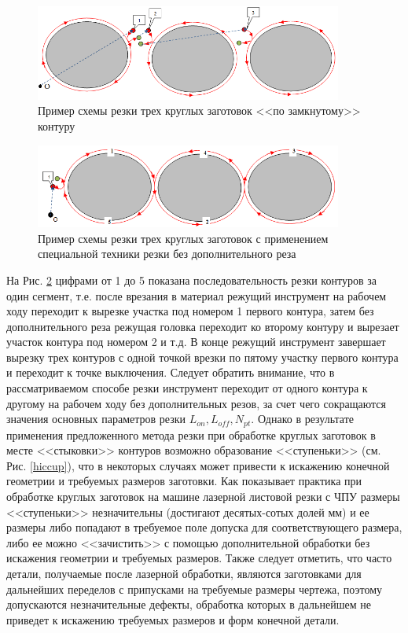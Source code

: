 \documentclass[11pt,twoside]{report}
\begin{document}
\begin{figure}
  \begin{center}
  \includegraphics[width=0.9\textwidth]{3-3.png}
  \caption{Пример схемы резки трех круглых заготовок <<по замкнутому>> контуру}
  \label{3-3}
  \end{center}
\end{figure}

\begin{figure}
  \begin{center}
  \includegraphics[width=0.9\textwidth]{3-1.png}
  \caption{Пример схемы резки трех круглых заготовок с применением специальной техники резки без дополнительного реза}
  \label{3-1}
  \end{center}
\end{figure}

На Рис. \ref{3-1}
цифрами от 1 до 5 показана последовательность
резки контуров за один сегмент,
т.е. после врезания в материал режущий инструмент
на рабочем ходу переходит к вырезке участка
под номером 1 первого контура,
затем без дополнительного реза режущая головка
переходит ко второму контуру и вырезает участок
контура под номером 2 и т.д.
В конце режущий инструмент завершает
вырезку трех контуров с одной точкой
врезки по пятому участку первого контура и
переходит к точке выключения.
Следует обратить внимание, что в рассматриваемом
способе резки инструмент переходит от одного контура к
другому на рабочем ходу без дополнительных резов,
за счет чего сокращаются значения основных параметров резки
$L_{on}, L_{off}, N_{pt}$.
Однако в результате применения предложенного метода
резки при обработке круглых заготовок в месте <<стыковки>>
контуров возможно образование <<ступеньки>>
(см. Рис. \ref{hiccup}),
что в некоторых случаях может привести к
искажению конечной геометрии и требуемых размеров заготовки.
Как показывает практика при обработке круглых заготовок на
машине лазерной листовой резки с ЧПУ размеры <<ступеньки>> незначительны
(достигают десятых-сотых долей мм)
и ее размеры либо попадают в требуемое поле допуска
для соответствующего размера, либо ее можно <<зачистить>>
с помощью дополнительной обработки без искажения геометрии и требуемых размеров.
Также следует отметить, что часто детали,
получаемые после лазерной обработки,
являются заготовками для дальнейших переделов с
припусками на требуемые размеры чертежа,
поэтому допускаются незначительные дефекты,
обработка которых в дальнейшем не приведет к
искажению требуемых размеров и форм конечной детали.
\end{document}
